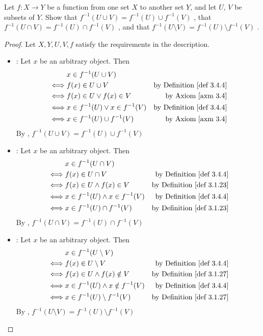\begin{exercise} \label{exercise 3.4.4}
Let \(f : X \to Y\) be a function from one set \(X\) to another set \(Y\), and let \(U\), \(V\) be subsets of \(Y\).
Show that \(f^{-1}(U \cup V) = f^{-1}(U) \cup f^{-1}(V)\) ,
that \(f^{-1}(U \cap V) = f^{-1}(U) \cap f^{-1}(V)\) ,
and that \(f^{-1}(U \setminus V) = f^{-1}(U) \setminus f^{-1}(V)\) .
\end{exercise}

\begin{proof} Let \(X, Y, U, V, f\) satisfy the requirements in the description.

\begin{itemize}
    \item {}: Let \(x\) be an arbitrary object. Then
        \begin{align*}
                 & x \in f^{-1}(U \cup V) \\
            \iff & f(x) \in U \cup V & \text{by \DEF{3.4.4}} \\
            \iff & f(x) \in U \lor f(x) \in V & \text{by \AXM{3.4}} \\
            \iff & x \in f^{-1}(U) \lor x \in f^{-1}(V) & \text{by \DEF{3.4.4}} \\
            \iff & x \in f^{-1}(U) \cup f^{-1}(V) & \text{by \AXM{3.4}}
        \end{align*}
        By , \(f^{-1}(U \cup V) = f^{-1}(U) \cup f^{-1}(V)\)
    \item {}: Let \(x\) be an arbitrary object. Then
        \begin{align*}
                 & x \in f^{-1}(U \cap V) \\
            \iff & f(x) \in U \cap V & \text{by \DEF{3.4.4}} \\
            \iff & f(x) \in U \land f(x) \in V & \text{by \DEF{3.1.23}} \\
            \iff & x \in f^{-1}(U) \land x \in f^{-1}(V) & \text{by \DEF{3.4.4}} \\
            \iff & x \in f^{-1}(U) \cap f^{-1}(V) & \text{by \DEF{3.1.23}}
        \end{align*}
        By , \(f^{-1}(U \cap V) = f^{-1}(U) \cap f^{-1}(V)\)
    \item {}: Let \(x\) be an arbitrary object. Then
        \begin{align*}
                 & x \in f^{-1}(U \setminus V) \\
            \iff & f(x) \in U \setminus V & \text{by \DEF{3.4.4}} \\
            \iff & f(x) \in U \land f(x) \notin V & \text{by \DEF{3.1.27}} \\
            \iff & x \in f^{-1}(U) \land x \notin f^{-1}(V) & \text{by \DEF{3.4.4}} \\
            \iff & x \in f^{-1}(U) \setminus f^{-1}(V) & \text{by \DEF{3.1.27}}
        \end{align*}
        By , \(f^{-1}(U \setminus V) = f^{-1}(U) \setminus f^{-1}(V)\)
\end{itemize}

\end{proof}

